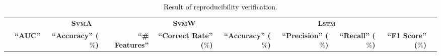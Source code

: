 \documentclass[letterpaper, 10 pt, conference]{ieeeconf}  %
\newcommand{\Review}[1]{\textcolor{black}{#1}}
\newcommand{\Impl}[1]{\textsc{#1}}
\begin{document}
\begin{table}[t]
\centering
\begin{threeparttable}[b]
    \caption{\Review{Result of reproducibility verification.}}
    \label{t:reprod}
    \begin{tabular}{|l|r|r|r | r | r|r|r|r|r|}
        \hline
        \multirow{3}{*}{}
        & \multicolumn{3}{c}{\bf \Impl{SvmA}}
        & \multicolumn{1}{|c}{\bf \Impl{SvmW}}
        & \multicolumn{5}{|c|}{\bf \Impl{Lstm}} \\
        \cline{2-10}
        & \multirow{2}{4.75em}{\bf ``AUC''} 
        & \multirow{2}{4.75em}{\!\!\!\!\!\bf ``Accuracy'' ($\%$)\!\!\!\!\!} 
        & \multirow{2}{4.75em}{\bf ``\# Features''}
        & \multirow{2}{4.75em}{\!\!\!\!\!\bf ``Correct Rate'' ($\%$)\!\!\!\!\!}
        & \multirow{2}{4.75em}{\!\!\!\!\!\bf ``Accuracy'' ($\%$)\!\!\!\!\!}
        & \multirow{2}{4.75em}{\!\!\!\!\!\bf ``Precision'' ($\%$)\!\!\!\!\!} 
        & \multirow{2}{4.75em}{\bf ``Recall'' ($\%$)}
        & \multirow{2}{4.75em}{\!\!\!\!\!\bf ``F1 Score'' ($\%$)\!\!\!\!\!}

\end{tabular}
\end{threeparttable}
\end{table}
\end{document}
